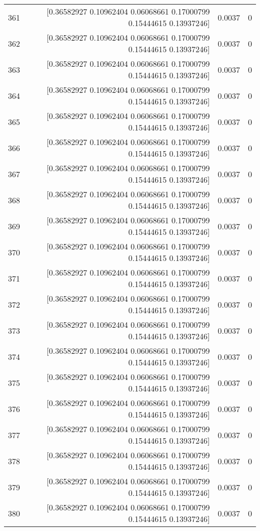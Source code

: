 \begin{longtable}{lrrr}
361 & [0.36582927 0.10962404 0.06068661 0.17000799 0.15444615 0.13937246] & 0.0037 & 0 \\
362 & [0.36582927 0.10962404 0.06068661 0.17000799 0.15444615 0.13937246] & 0.0037 & 0 \\
363 & [0.36582927 0.10962404 0.06068661 0.17000799 0.15444615 0.13937246] & 0.0037 & 0 \\
364 & [0.36582927 0.10962404 0.06068661 0.17000799 0.15444615 0.13937246] & 0.0037 & 0 \\
365 & [0.36582927 0.10962404 0.06068661 0.17000799 0.15444615 0.13937246] & 0.0037 & 0 \\
366 & [0.36582927 0.10962404 0.06068661 0.17000799 0.15444615 0.13937246] & 0.0037 & 0 \\
367 & [0.36582927 0.10962404 0.06068661 0.17000799 0.15444615 0.13937246] & 0.0037 & 0 \\
368 & [0.36582927 0.10962404 0.06068661 0.17000799 0.15444615 0.13937246] & 0.0037 & 0 \\
369 & [0.36582927 0.10962404 0.06068661 0.17000799 0.15444615 0.13937246] & 0.0037 & 0 \\
370 & [0.36582927 0.10962404 0.06068661 0.17000799 0.15444615 0.13937246] & 0.0037 & 0 \\
371 & [0.36582927 0.10962404 0.06068661 0.17000799 0.15444615 0.13937246] & 0.0037 & 0 \\
372 & [0.36582927 0.10962404 0.06068661 0.17000799 0.15444615 0.13937246] & 0.0037 & 0 \\
373 & [0.36582927 0.10962404 0.06068661 0.17000799 0.15444615 0.13937246] & 0.0037 & 0 \\
374 & [0.36582927 0.10962404 0.06068661 0.17000799 0.15444615 0.13937246] & 0.0037 & 0 \\
375 & [0.36582927 0.10962404 0.06068661 0.17000799 0.15444615 0.13937246] & 0.0037 & 0 \\
376 & [0.36582927 0.10962404 0.06068661 0.17000799 0.15444615 0.13937246] & 0.0037 & 0 \\
377 & [0.36582927 0.10962404 0.06068661 0.17000799 0.15444615 0.13937246] & 0.0037 & 0 \\
378 & [0.36582927 0.10962404 0.06068661 0.17000799 0.15444615 0.13937246] & 0.0037 & 0 \\
379 & [0.36582927 0.10962404 0.06068661 0.17000799 0.15444615 0.13937246] & 0.0037 & 0 \\
380 & [0.36582927 0.10962404 0.06068661 0.17000799 0.15444615 0.13937246] & 0.0037 & 0 \\

\end{longtable}

